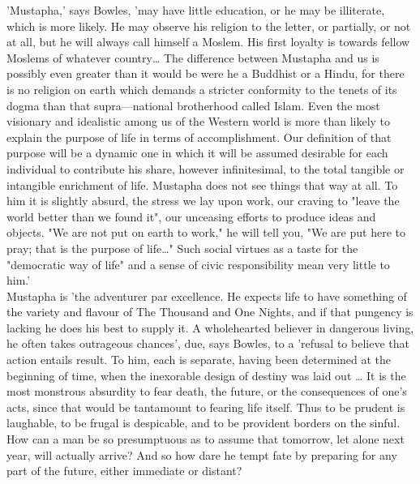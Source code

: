\documentclass[11pt, b5paper, twoside]{book}
\begin{document}
'Mustapha,' says Bowles, 'may have little education, or he may be illiterate, which is more likely. He may observe his religion to the letter, or partially, or not at all, but he will always call himself a Moslem. His first loyalty is towards fellow Moslems of whatever country\ldots{} The difference between Mustapha and us is possibly even greater than it would be were he a Buddhist or a Hindu, for there is no religion on earth which demands a stricter conformity to the tenets of its dogma than that supra---national brotherhood called Islam. Even the most visionary and idealistic among us of the Western world is more than likely to explain the purpose of life in terms of accomplishment. Our definition of that purpose will be a dynamic one in which it will be assumed desirable for each individual to contribute his share, however infinitesimal, to the total tangible or intangible enrichment of life. Mustapha does not see things that way at all. To him it is slightly absurd, the stress we lay upon work, our craving to "leave the world better than we found it", our unceasing efforts to produce ideas and objects. "We are not put on earth to work," he will tell you, "We are put here to pray; that is the purpose of life\ldots{}" Such social virtues as a taste for the "democratic way of life" and a sense of civic responsibility mean very little to him.' \\

Mustapha is 'the adventurer par excellence. He expects life to have something of the variety and flavour of The Thousand and One Nights, and if that pungency is lacking he does his best to supply it. A wholehearted believer in dangerous living, he often takes outrageous chances', due, says Bowles, to a 'refusal to believe that action entails result. To him, each is separate, having been determined at the beginning of time, when the inexorable design of destiny was laid out \ldots{} It is the most monstrous absurdity to fear death, the future, or the consequences of one's acts, since that would be tantamount to fearing life itself. Thus to be prudent is laughable, to be frugal is despicable, and to be provident borders on the sinful. How can a man be so presumptuous as to assume that tomorrow, let alone next year, will actually arrive? And so how dare he tempt fate by preparing for any part of the future, either immediate or distant? \\
\end{document}
